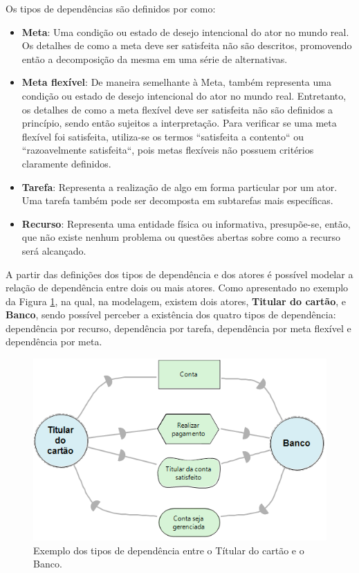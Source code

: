 Os tipos de dependências são definidos por \cite{istarwiki20} como: 

\begin{itemize}
	
	\item \textbf{Meta}: Uma condição ou estado de desejo intencional do ator no mundo real. Os detalhes de como a meta deve ser satisfeita não são descritos, promovendo então a decomposição da mesma em uma série de alternativas.  
	 
	\item \textbf{Meta flexível}: De maneira semelhante à Meta, também representa uma condição ou estado de desejo intencional do ator no mundo real. Entretanto, os detalhes de como a meta flexível deve ser satisfeita não são definidos a princípio, sendo então sujeitos a interpretação. Para verificar se uma meta flexível foi satisfeita, utiliza-se os termos ``satisfeita a contento`` ou ``razoavelmente satisfeita``, pois metas flexíveis não possuem critérios claramente definidos. 
	
	\item \textbf{Tarefa}: Representa a realização de algo em forma particular por um ator. Uma tarefa também pode ser decomposta em subtarefas mais específicas. 
	
	\item \textbf{Recurso}: Representa uma entidade física ou informativa, presupõe-se, então, que não existe nenhum problema ou questões abertas sobre como a recurso será alcançado.
	 
\end{itemize}

A partir das definições dos tipos de dependência e dos atores é possível modelar a relação de dependência entre dois ou mais atores. Como apresentado no exemplo da Figura \ref{exemploTipoDeDepencia}, na qual, na modelagem, existem dois atores, \textbf{Titular do cartão}, e \textbf{Banco}, sendo possível perceber a existência dos quatro tipos de dependência: dependência por recurso, dependência por tarefa, dependência por meta flexível e dependência por meta.  

\begin{figure}[h!]
	\centering
	\includegraphics[keepaspectratio=true,scale=1.0]{figuras/ExemploTiposDeDependecias.PNG}
	\caption{Exemplo dos tipos de dependência entre o Títular do cartão e o Banco.}
	\label{exemploTipoDeDepencia}
\end{figure} 


